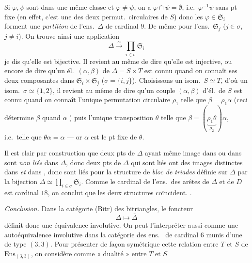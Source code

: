 \documentclass[11pt,a4paper]{article}
\begin{document}
Si $\varphi,\psi$  sont dans une même classe  et $\varphi\neq\psi$, on a $\varphi\cap\psi=\emptyset$, i.e.\ $\varphi^{-1}\psi$ sans pt fixe (en effet, c'est une des deux permut.\ circulaires de $S$) donc les $\varphi\in\mathfrak{S}_i$ forment une \emph{partition} de l'ens.\ $\Delta$ de cardinal $9$. De même pour l'ens.\ $\mathfrak{S}_j$ ($j\in\sigma$, $j\neq i$). On trouve ainsi une application
\[
\Delta\xrightarrow{\ \sim\ }\prod_{i\in\sigma}\mathfrak{S}_i
\]
je dis qu'elle est bijective. Il revient au même de dire qu'elle est injective, ou encore de dire qu'un él.\ $(\alpha,\beta)$ de $\Delta=S\times T$ est connu quand on connaît ses deux composantes dans $\mathfrak{S}_i\times\mathfrak{S}_j$ ($\sigma=\lbrace i,j\rbrace$). Choisissons un isom.\ $S\simeq T$,  d'où un isom.\ $\sigma\simeq\lbrace1,2\rbrace$, \struck{\ill{}} il revient au même de dire qu'un couple $(\alpha,\beta)$ d'él.\ de $S$ est connu quand on connaît l'unique permutation circulaire $\rho_1$ telle que $\beta=\rho_1\alpha$ (ceci détermine $\beta$ quand $\alpha$ \ill{}) puis l'unique transposition $\theta$ telle que $\beta=(\underbrace{\rho_1\theta}_{\rho_2})\alpha$, i.e.\ telle que $\theta\alpha=\alpha$ --- or $\alpha$ est le  pt fixe de $\theta$.

\struck{\ill{}} Il est clair par construction que deux pts de $\Delta$ ayant même image dans \ill{} ou dans \ill{} sont \emph{non liés} dans $\Delta$, donc deux pts de $\Delta$ qui sont liés ont des images distinctes dans \ill{} \emph{et} dans \ill{}, donc sont liés pour la \struck{\ill{}} structure de \emph{bloc de triades}  définie sur $\Delta$ par la bijection $\Delta\simeq\prod_{i\in\sigma}\mathfrak{S}_i$. Comme le cardinal de l'ens.\ des arêtes de $\Delta$ et de $D$ est  cardinal $18$, on conclut que les deux structures coïncident. .

\emph{Conclusion.} Dans la catégorie  (Bitr) des bitriangles, le foncteur
\[
\Delta\longmapsto\bar\Delta
\]
définit donc une \struck{\ill{}} équivalence involutive. On peut l'interpréter aussi comme une autoéquivalence involutive dans la catégorie des ens.\  de cardinal $6$ munis d'une  \struck{\ill{}} de type $(3,3)$. Pour présenter de façon symétrique cette relation entre $T$ et $S$ de $\mathrm{Ens}_{(3,3)}$, on considère comme « dualité » entre $T$ et $S$
\end{document}
